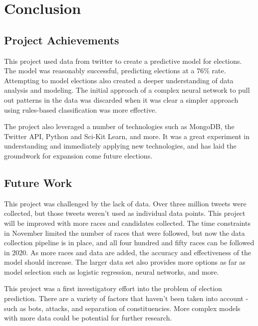 \documentclass[11pt, twoside, reqno]{book}
\begin{document}
\chapter{Conclusion}
\section{Project Achievements}
\hspace{0.2in}This project used data from twitter to create a predictive model for elections. The model was reasonably successful, predicting elections at a 76\% rate. Attempting to model elections also created a deeper understanding of data analysis and modeling. The initial approach of a complex neural network to pull out patterns in the data was discarded when it was clear a simpler approach using rules-based classification was more effective. 

The project also leveraged a number of technologies such as MongoDB, the Twitter API, Python and Sci-Kit Learn, and more. It was a great experiment in understanding and immediately applying new technologies, and has laid the groundwork for expansion come future elections. 


\section{Future Work}
\hspace{0.2in} This project was challenged by the lack of data. Over three million tweets were collected, but those tweets weren't used as individual data points. This project will be improved with more races and candidates collected. The time constraints in November limited the number of races that were followed, but now the data collection pipeline is in place, and all four hundred and fifty races can be followed in 2020. As more races and data are added, the accuracy and effectiveness of the model should increase. The larger data set also provides more options as far as model selection such as logistic regression, neural networks, and more. 

This project was a first investigatory effort into the problem of election prediction. There are a variety of factors that haven't been taken into account - such as bots, attacks, and separation of constituencies. More complex models with more data could be potential for further research. 
\end{document}
